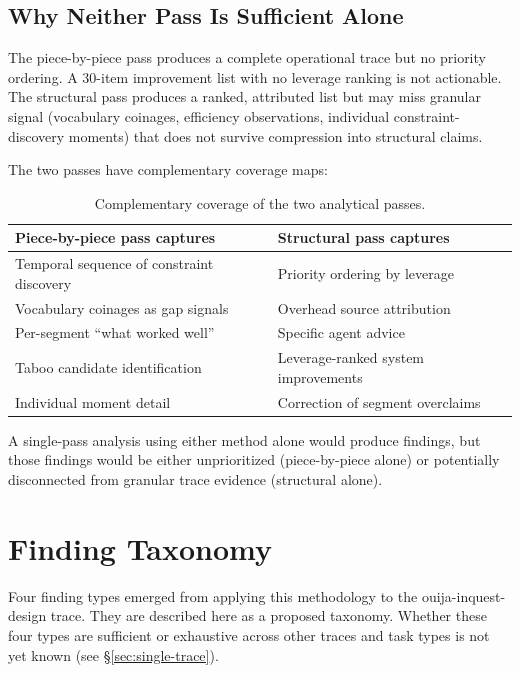 \documentclass[11pt,a4paper]{article}
\begin{document}
\subsection{Why Neither Pass Is Sufficient Alone}

The piece-by-piece pass produces a complete operational trace but no priority
ordering. A 30-item improvement list with no leverage ranking is not
actionable. The structural pass produces a ranked, attributed list but may miss
granular signal (vocabulary coinages, efficiency observations, individual
constraint-discovery moments) that does not survive compression into structural
claims.

The two passes have complementary coverage maps:

\begin{table}[h]
\centering
\small
\caption{Complementary coverage of the two analytical passes.}
\label{tab:coverage}
\begin{tabular}{@{}p{6.5cm}p{6.5cm}@{}}
\toprule
Piece-by-piece pass captures & Structural pass captures \\
\midrule
Temporal sequence of constraint discovery & Priority ordering by leverage \\
Vocabulary coinages as gap signals & Overhead source attribution \\
Per-segment ``what worked well'' & Specific agent advice \\
Taboo candidate identification & Leverage-ranked system improvements \\
Individual moment detail & Correction of segment overclaims \\
\bottomrule
\end{tabular}
\end{table}

A single-pass analysis using either method alone would produce findings, but
those findings would be either unprioritized (piece-by-piece alone) or
potentially disconnected from granular trace evidence (structural alone).

\section{Finding Taxonomy}

Four finding types emerged from applying this methodology to the
ouija-inquest-design trace. They are described here as a proposed taxonomy.
Whether these four types are sufficient or exhaustive across other traces and
task types is not yet known (see \S\ref{sec:single-trace}).
\end{document}
